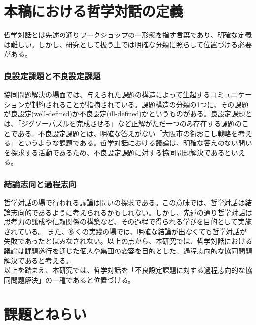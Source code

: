 \documentclass[11pt, a4paper]{jreport} %
\begin{document}
\section{本稿における哲学対話の定義}
哲学対話とは先述の通りワークショップの一形態を指す言葉であり、明確な定義は難しい。しかし、研究として扱う上では明確な分類に照らして位置づける必要がある。


\subsubsection{良設定課題と不良設定課題}
協同問題解決の場面では、与えられた課題の構造によって生起するコミュニケーションが制約されることが指摘されている\cite{10024885057}。課題構造の分類の1つに、その課題が良設定(well-defined)か不良設定(ill-defined)かというものがある。良設定課題とは、「ジグソーパズルを完成させる」など正解がただ一つのみ存在する課題のことである。不良設定課題とは、明確な答えがない「大阪市の街おこし戦略を考える」というような課題である。哲学対話における議論は、明確な答えのない問いを探求する活動であるため、不良設定課題に対する協同問題解決であるといえる。

\subsubsection{結論志向と過程志向}
哲学対話の場で行われる議論は問いの探求である。この意味では、哲学対話は結論志向的であるように考えられるかもしれない。しかし、先述の通り哲学対話は思考力の醸成や信頼関係の構築など、その過程で得られる学びを目的として実施されている。
また、多くの実践の場では、明確な結論が出なくても哲学対話が失敗であったとはみなされない。以上の点から、本研究では、哲学対話における議論は課題遂行を通じた個人や集団の変容を目的とした、過程志向的な協同問題解決であると考える。\\


以上を踏まえ、本研究では、哲学対話を「不良設定課題に対する過程志向的な協同問題解決」の一種であると位置づける。%



\section{課題とねらい}
\end{document}
